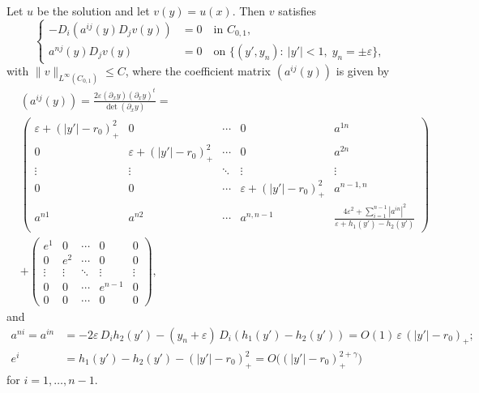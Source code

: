 \documentclass[reqno, 10pt]{amsart}
\theoremstyle{plain}
\theoremstyle{definition}
\theoremstyle{remark}
\numberwithin{equation}{section}
\begin{document}
Let $u$ be the solution and let $v(y) = u(x)$. Then $v$ satisfies
\begin{equation*}%
\left\{
\begin{aligned}
-D_i(a^{ij}(y) D_j v(y)) &=0 \quad \mbox{in } C_{0,1},\\
a^{nj}(y) D_j v(y) &= 0 \quad \mbox{on } \{(y',y_n):~|y'|<1,\; y_n=\pm \varepsilon\},
\end{aligned}
\right.
\end{equation*}
with $\|v\|_{L^\infty(C_{0,1})} \le C$,
where the coefficient matrix $(a^{ij}(y))$ is given by
\begin{align}\label{a_ij_formula}
&(a^{ij}(y)) = \frac{ 2 \varepsilon(\partial_x y)(\partial_x y)^t}{\det (\partial_x y)} =\nonumber\\
& \begin{pmatrix}
\varepsilon + (|y'|-r_0)_+^2 &0 &\cdots &0 &a^{1n}\\
0 &\varepsilon + (|y'|-r_0)_+^2 &\cdots &0 &a^{2n}\\
\vdots &\vdots &\ddots &\vdots &\vdots\\
0 &0 &\cdots &\varepsilon + (|y'|-r_0)_+^2 &a^{n-1,n}\\
a^{n1} &a^{n2} &\cdots &a^{n,n-1} &  \frac{4\varepsilon^2 + \sum_{i=1}^{n-1}|a^{in}|^2}{\varepsilon + h_1(y') - h_2(y')}
\end{pmatrix}\nonumber\\
&+
\begin{pmatrix}
e^1 &0 &\cdots &0 &0\\
0 &e^2 &\cdots &0 &0\\
\vdots &\vdots &\ddots &\vdots &\vdots\\
0 &0 &\cdots & e^{n-1} &0\\
0 &0 &\cdots & 0 &0
\end{pmatrix},
\end{align}
and
\begin{equation}\label{a_ij_estimate}
\begin{aligned}
a^{ni} = a^{in} &= -2\varepsilon\, D_i h_2(y') - (y_n + \varepsilon)\,D_i(h_1(y') - h_2(y')) = O(1)\, \varepsilon \,(|y'|-r_0)_+;\\
e^{i} &= h_1(y')-h_2(y')-(|y'|-r_0)_+^2 = O\Big( (|y'|-r_0)_+^{2+\gamma} \Big)
\end{aligned}
\end{equation}
for $i = 1, \ldots , n-1$.
\end{document}
